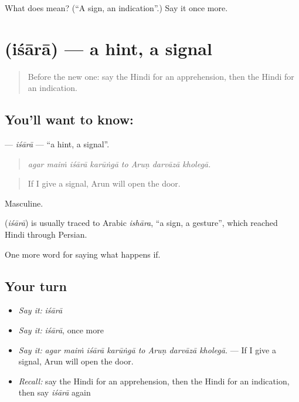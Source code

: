 \begin{tcolorbox}[breakable,colback=teal!4,colframe=teal!35!black,title={Before you move on}]
What does  mean? (\textquotedblleft{}A sign, an indication\textquotedblright{}.) Say it once more.
\end{tcolorbox}
\section[\texorpdfstring{\hi{इशारा} (iśārā)}{इशारा (iśārā)}]{ (iśārā) — a hint, a signal}

\label{lesson:HI-C375-isara}



\begin{quote}
Before the new one: say the Hindi for an apprehension, then the Hindi for an indication.
\end{quote}

\subsection*{You'll want to know: }
\textbf{} — \emph{iśārā} — \textquotedblleft{}a hint, a signal\textquotedblright{}.

\begin{quote}
       
\end{quote}

\begin{quote}
\emph{agar maiṁ iśārā karūṅgā to Aruṇ darvāzā kholegā.}
\end{quote}

\begin{quote}
If I give a signal, Arun will open the door.
\end{quote}

Masculine.

\begin{cousinweb}
\textbf{} (\emph{iśārā}) is usually traced to Arabic \emph{ishāra}, \textquotedblleft{}a sign, a gesture\textquotedblright{}, which reached Hindi through Persian.
\end{cousinweb}

\begin{grammarlens}[title={What you've built}]
One more word for saying what happens if.
\end{grammarlens}

\subsection*{Your turn}
\begin{itemize}
\raggedright
  \item \emph{Say it:} \emph{iśārā}
  \item \emph{Say it:} \emph{iśārā}, once more
  \item \emph{Say it:} \emph{agar maiṁ iśārā karūṅgā to Aruṇ darvāzā kholegā.} — If I give a signal, Arun will open the door.
  \item \emph{Recall:} say the Hindi for an apprehension, then the Hindi for an indication, then say \emph{iśārā} again
\end{itemize}

